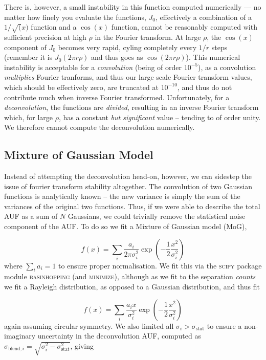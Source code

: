 \documentclass[fleqn,usenatbib]{mnras}
\begin{document}
There is, however, a small instability in this function computed numerically --- no matter how finely you evaluate the functions, $J_0$, effectively a combination of a $1/\sqrt(x)$ function and a $\cos(x)$ function, cannot be reasonably computed with sufficient precision at high $\rho$ in the Fourier transform. At large $\rho$, the $\cos(x)$ component of $J_0$ becomes very rapid, cyling completely every $1/r$ steps (remember it is $J_0(2 \pi r \rho)$ and thus goes as $\cos(2 \pi r \rho)$). This numerical instability is acceptable for a \textit{convolution} (being of order $10^{-5}$), as a convolution \textit{multiplies} Fourier tranforms, and thus our large scale Fourier transform values, which should be effectively zero, are truncated at $10^{-10}$, and thus do not contribute much when inverse Fourier transformed. Unfortunately, for a \textit{deconvolution}, the functions are \textit{divided}, resulting in an inverse Fourier transform which, for large $\rho$, has a constant \textit{but significant} value -- tending to of order unity. We therefore cannot compute the deconvolution numerically.

\subsection{Mixture of Gaussian Model}
Instead of attempting the deconvolution head-on, however, we can sidestep the issue of fourier transform stability altogether. The convolution of two Gaussian functions is analytically known -- the new variance is simply the sum of the variances of the original two functions. Thus, if we were able to describe the total AUF as a sum of $N$ Gaussians, we could trivially remove the statistical noise component of the AUF. To do so we fit a Mixture of Gaussian model (MoG),

\begin{equation}
	f(x) = \sum\limits_i \frac{a_i}{2 \pi \sigma_i^2} \exp{\left(-\frac{1}{2}\frac{x^2}{\sigma_i^2}\right)}
\end{equation}
where $\sum_i a_i = 1$ to ensure proper normalisation. We fit this via the \textsc{scipy} package module \textsc{basinhopping} (and \textsc{minimize}), although as we fit to the separation \textit{counts} we fit a Rayleigh distribution, as opposed to a Gaussian distribution, and thus fit

\begin{equation}
	f(x) = \sum\limits_i \frac{a_i x}{\sigma_i^2} \exp{\left(-\frac{1}{2}\frac{x^2}{\sigma_i^2}\right)}
\end{equation}
again assuming circular symmetry. We also limited all $\sigma_i > \sigma_\mathrm{stat}$ to ensure a non-imaginary uncertainty in the deconvolution AUF, computed as $\sigma_{\mathrm{blend}, i} = \sqrt{\sigma_i^2 - \sigma_\mathrm{stat}^2}$, giving
\end{document}
